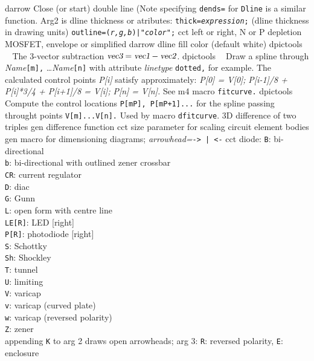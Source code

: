 %
  {darrow}%
  {Close (or start) double line (Note specifying {\tt dends=} for {\tt Dline}%
   is a similar function.  Arg2 is dline thickness or atributes:
   {\tt thick={\sl expression};} (dline thickness in drawing units)
   {\tt outline=({\sl r,g,b})|"{\sl color}";}}%
%
  {cct}%
  {left or right, N or P depletion MOSFET, envelope or simplified
    }%
%
  {darrow}%
  {dline fill color (default white)}%
%
  {dpictools}%
  {$\;\;$ The 3-vector subtraction
    $\hbox{\sl vec3} = \hbox{\sl vec1} - \hbox{\sl vec2}$.}%
%
  {dpictools}%
  {$\;\;$ Draw a spline through {\sl Name}{\tt [m],} \ldots {\sl Name}{\tt [n]}%
   with attribute {\sl linetype} {\tt dotted,} for example.
   The calculated control points {\sl P[i]} satisfy approximately:
   {\sl P[0] = V[0];} {\sl P[i-1]/8 + P[i]*3/4 + P[i+1]/8 = V[i];}%
   {\sl P[n] = V[n].}  See m4 macro {\tt fitcurve.}}%
%
  {dpictools}%
  {$\;\;$ Compute the control locations {\tt P[mP], P[mP+1]...} for
  the spline passing throught points {\tt V[m]...V[n].}  Used by
  macro {\tt dfitcurve}.}%
%
  {3D}%
  {difference of two triples}%
%
  {gen}%
  {difference function}%
%
  {cct}%
  {size parameter for scaling circuit element bodies }%
%
  {gen}%
  {macro for dimensioning diagrams;
      {\sl arrowhead=}{\tt -> | <-}}%
%
  {cct}%
  {diode:
   {\tt B}: bi-directional\\
   {\tt b}: bi-directional with outlined zener crossbar\\
   {\tt CR}: current regulator\\
   {\tt D}: diac\\
   {\tt G}: Gunn\\
   {\tt L}: open form with centre line\\
   {\tt LE[R]}: LED [right]\\
   {\tt P[R]}: photodiode [right]\\
   {\tt S}: Schottky\\
   {\tt Sh}: Shockley\\
   {\tt T}: tunnel\\
   {\tt U}: limiting\\
   {\tt V}: varicap\\
   {\tt v}: varicap (curved plate)\\
   {\tt w}: varicap (reversed polarity)\\
   {\tt Z}: zener\\
   appending {\tt K} to arg 2 draws open arrowheads;
   arg 3: {\tt R}: reversed polarity, {\tt E}: enclosure }%
